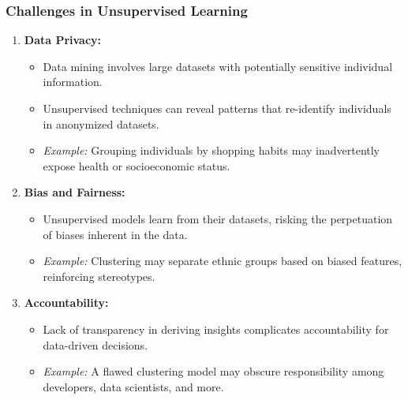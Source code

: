\documentclass[aspectratio=169]{beamer}
\begin{document}
\begin{frame}[fragile]
  \frametitle{Challenges in Unsupervised Learning}
  \begin{enumerate}
    \item \textbf{Data Privacy:}
      \begin{itemize}
        \item Data mining involves large datasets with potentially sensitive individual information.
        \item Unsupervised techniques can reveal patterns that re-identify individuals in anonymized datasets.
        \item \textit{Example:} Grouping individuals by shopping habits may inadvertently expose health or socioeconomic status.
      \end{itemize}
    
    \item \textbf{Bias and Fairness:}
      \begin{itemize}
        \item Unsupervised models learn from their datasets, risking the perpetuation of biases inherent in the data.
        \item \textit{Example:} Clustering may separate ethnic groups based on biased features, reinforcing stereotypes.
      \end{itemize}
    
    \item \textbf{Accountability:}
      \begin{itemize}
        \item Lack of transparency in deriving insights complicates accountability for data-driven decisions.
        \item \textit{Example:} A flawed clustering model may obscure responsibility among developers, data scientists, and more.
      \end{itemize}
  \end{enumerate}
\end{frame}
\end{document}
